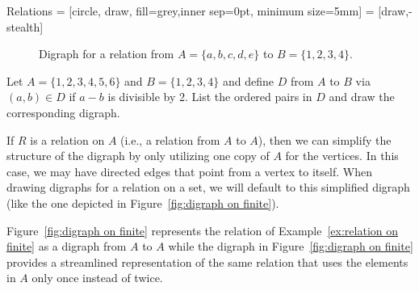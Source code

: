 \begin{section}{Relations}
 = [circle, draw, fill=grey,inner sep=0pt, minimum size=5mm]
 = [draw,-stealth]

\begin{figure}[h!]
\begin{center}
\caption{Digraph for a relation from $A=\{a,b,c,d,e\}$ to $B=\{1,2,3,4\}$.}\label{fig:digraph finite to finite}
\end{center}
\end{figure}

\begin{problem}
Let $A=\{1,2,3,4,5,6\}$ and $B=\{1,2,3,4\}$ and define $D$ from $A$ to $B$ via $(a,b)\in D$ if $a-b$ is divisible by 2.  List the ordered pairs in $D$ and draw the corresponding digraph.
\end{problem}

If $R$ is a relation on $A$ (i.e., a relation from $A$ to $A$), then we can simplify the structure of the digraph by only utilizing one copy of $A$ for the vertices. In this case, we may have directed edges that point from a vertex to itself.  When drawing digraphs for a relation on a set, we will default to this simplified digraph (like the one depicted in Figure~\ref{fig:digraph on finite}).

\begin{example}\label{ex:digraph}
Figure~\ref{fig:digraph on finite} represents the relation of Example~\ref{ex:relation on finite} as a digraph from $A$ to $A$ while the digraph in Figure~\ref{fig:digraph on finite} provides a streamlined representation of the same relation that uses the elements in $A$ only once instead of twice.
\end{example}


\end{section}

